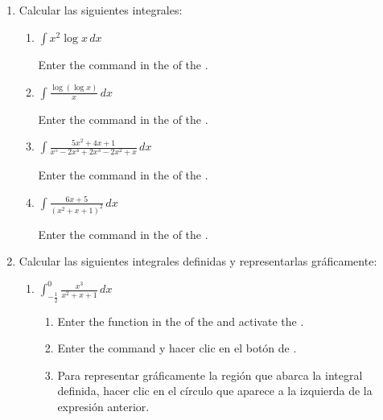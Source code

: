 \begin{enumerate}[leftmargin=*]
\item Calcular las siguientes integrales:
      \begin{enumerate}
      \item $ \int{x^2 \log x\,dx}$
            \begin{indication}
            Enter the command  in the  of the .
            \end{indication}

      \item $\displaystyle \int \frac{\log(\log x)}{x}\,dx$
            \begin{indication}
            Enter the command  in the  of the .
            \end{indication}

      \item $\displaystyle \int \frac{5x^{2}+4x+1}{x^{5}-2x^{4}+2x^{3}-2x^{2}+x}\,dx$
            \begin{indication}
            Enter the command  in the  of the .
            \end{indication}

      \item $\displaystyle \int \frac{6x+5}{(x^{2}+x+1)^{2}}\,dx$
            \begin{indication}
            Enter the command  in the  of the .
            \end{indication}
      \end{enumerate}


\item Calcular las siguientes integrales definidas y representarlas gráficamente:
      \begin{enumerate}
      \item $\displaystyle \int_{-\frac{1}{2}}^0 \frac{x^{3}}{x^{2}+x+1}\,dx$
            \begin{indication}
            \begin{enumerate}
            \item Enter the function  in the  of the  and activate the .
            \item Enter the command  y hacer clic en el botón de .
            \item Para representar gráficamente la región que abarca la integral definida, hacer clic en el círculo que aparece a la izquierda de la expresión anterior.
            \end{enumerate}
            \end{indication}


\end{enumerate}
\end{enumerate}
